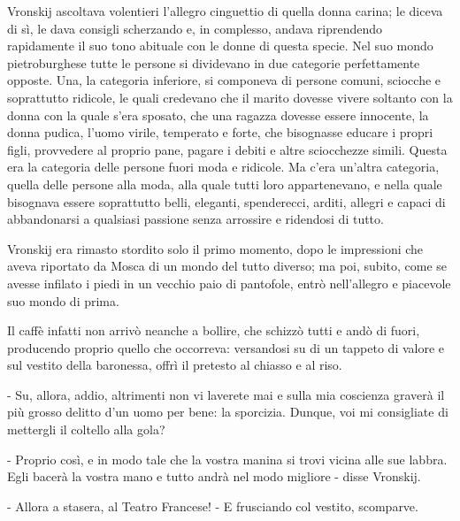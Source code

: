 Vronskij ascoltava volentieri l'allegro cinguettio di quella donna carina; le diceva di sì, le dava consigli scherzando e, in complesso, andava riprendendo rapidamente il suo tono abituale con le donne di questa specie. Nel suo mondo pietroburghese tutte le persone si dividevano in due categorie perfettamente opposte. Una, la categoria inferiore, si componeva di persone comuni, sciocche e soprattutto ridicole, le quali credevano che il marito dovesse vivere soltanto con la donna con la quale s'era sposato, che una ragazza dovesse essere innocente, la donna pudica, l'uomo virile, temperato e forte, che bisognasse educare i propri figli, provvedere al proprio pane, pagare i debiti e altre sciocchezze simili. Questa era la categoria delle persone fuori moda e ridicole. Ma c'era un'altra categoria, quella delle persone alla moda, alla quale tutti loro appartenevano, e nella quale bisognava essere soprattutto belli, eleganti, spenderecci, arditi, allegri e capaci di abbandonarsi a qualsiasi passione senza arrossire e ridendosi di tutto. 

Vronskij era rimasto stordito solo il primo momento, dopo le impressioni che aveva riportato da Mosca di un mondo del tutto diverso; ma poi, subito, come se avesse infilato i piedi in un vecchio paio di pantofole, entrò nell'allegro e piacevole suo mondo di prima. 

Il caffè infatti non arrivò neanche a bollire, che schizzò tutti e andò di fuori, producendo proprio quello che occorreva: versandosi su di un tappeto di valore e sul vestito della baronessa, offrì il pretesto al chiasso e al riso. 

- Su, allora, addio, altrimenti non vi laverete mai e sulla mia coscienza graverà il più grosso delitto d'un uomo per bene: la sporcizia. Dunque, voi mi consigliate di mettergli il coltello alla gola? 

- Proprio così, e in modo tale che la vostra manina si trovi vicina alle sue labbra. Egli bacerà la vostra mano e tutto andrà nel modo migliore - disse Vronskij. 

- Allora a stasera, al Teatro Francese! - E frusciando col vestito, scomparve. 

